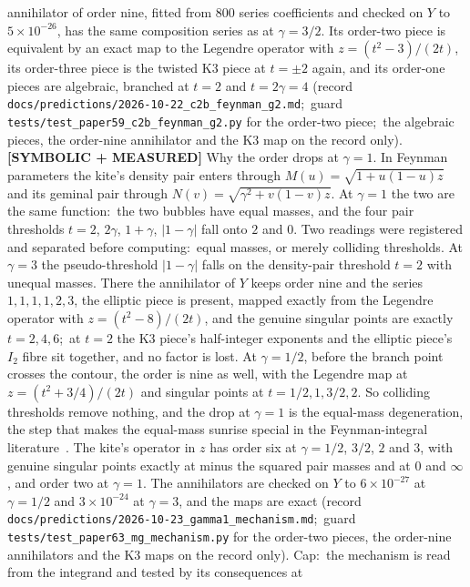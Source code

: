 \documentclass[aps,pra,twocolumn,superscriptaddress,longbibliography]{revtex4-2}
\begin{document}
annihilator of order nine, fitted from 800 series coefficients and
checked on $Y$ to $5\times10^{-26}$, has the same composition series
as at $\gamma=3/2$.  Its order-two piece is equivalent by an exact map
to the Legendre operator with $z=(t^2-3)/(2t)$, its order-three piece is
the twisted K3 piece at $t=\pm2$ again, and its order-one pieces are
algebraic, branched at $t=2$ and $t=2\gamma=4$ (record
\texttt{docs/predictions/2026-10-22\_c2b\_feynman\_g2.md};\ guard
\texttt{tests/test\_paper59\_c2b\_feynman\_g2.py} for the order-two piece;\
the algebraic pieces, the order-nine annihilator and the K3 map on the
record only).
\textbf{[SYMBOLIC + MEASURED]} Why the order drops at $\gamma=1$.  In
Feynman parameters the kite's density pair enters through
$M(u)=\sqrt{1+u(1-u)z}$ and its geminal pair through
$N(v)=\sqrt{\gamma^2+v(1-v)z}$.  At $\gamma=1$ the two are the same
function:\ the two bubbles have equal masses, and the four pair thresholds
$t=2$, $2\gamma$, $1+\gamma$, $|1-\gamma|$ fall onto $2$ and $0$.  Two
readings were registered and separated before computing:\ equal masses,
or merely colliding thresholds.  At $\gamma=3$ the pseudo-threshold
$|1-\gamma|$ falls on the density-pair threshold $t=2$ with unequal
masses.  There the annihilator of $Y$ keeps order nine and the series
$1,1,1,1,2,3$, the elliptic piece is present, mapped exactly from the
Legendre operator with $z=(t^2-8)/(2t)$, and the genuine singular points
are exactly $t=2,4,6$;\ at $t=2$ the K3 piece's half-integer exponents and
the elliptic piece's $I_2$ fibre sit together, and no factor is lost.  At
$\gamma=1/2$, before the branch point crosses the contour, the order is
nine as well, with the Legendre map at $z=(t^2+3/4)/(2t)$ and singular
points at $t=1/2,1,3/2,2$.  So colliding thresholds remove nothing, and
the drop at $\gamma=1$ is the equal-mass degeneration, the step that
makes the equal-mass sunrise special in the Feynman-integral
literature~\cite{blochvanhove2015}.  The kite's operator in $z$ has order
six at $\gamma=1/2$, $3/2$, $2$ and $3$, with genuine singular points
exactly at minus the squared pair masses and at $0$ and $\infty$, and
order two at $\gamma=1$.  The annihilators are checked on $Y$ to
$6\times10^{-27}$ at $\gamma=1/2$ and $3\times10^{-24}$ at $\gamma=3$,
and the maps are exact (record
\texttt{docs/predictions/2026-10-23\_gamma1\_mechanism.md};\ guard
\texttt{tests/test\_paper63\_mg\_mechanism.py} for the order-two pieces,
the order-nine annihilators and the K3 maps on the record only).  Cap:\ the
mechanism is read from the integrand and tested by its consequences at
\end{document}
